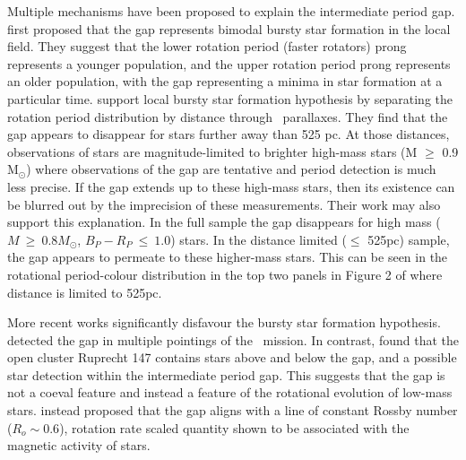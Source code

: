 Multiple mechanisms have been proposed to explain the intermediate period gap.
\citet{mcquillan_rotation_2014} first proposed that the gap represents bimodal bursty star formation in the local \kepler{} field.
They suggest that the lower rotation period (faster rotators) prong represents a younger population, and the upper rotation period prong represents an older population, with the gap representing a minima in star formation at a particular time.
\citet{davenport_rotating_2018} support local bursty star formation hypothesis by separating the \kepler{} rotation period distribution by distance through \gaia{} \ parallaxes.
They find that the gap appears to disappear for stars further away than 525 pc.
At those distances, observations of stars are magnitude-limited to brighter high-mass stars (M $\geq$ 0.9 M$_{\odot}$) where observations of the gap are tentative and period detection is much less precise.
If the gap extends up to these high-mass stars, then its existence can be blurred out by the imprecision of these measurements.
Their work may also support this explanation.
In the full \citep{mcquillan_rotation_2014} sample the gap disappears for high mass ($M \ \geq \ 0.8 M_{\odot}$, $B_P - R_P \ \leq \ 1.0$) stars.
In the distance limited ($\leq$ 525pc) sample, the gap appears to permeate to these higher-mass stars. 
This can be seen in the rotational period-colour distribution in the top two panels in Figure 2 of \citet{davenport_rotating_2018} where distance is limited to 525pc.

More recent works significantly disfavour the bursty star formation hypothesis.
\citet{gordon_stellar_2021} detected the gap in multiple pointings of the \ktoo \ mission. 
In contrast, \citet{curtis_when_2020} found that the open cluster Ruprecht 147 contains stars above and below the gap, and a possible star detection within the intermediate period gap.
This suggests that the gap is not a coeval feature and instead a feature of the rotational evolution of low-mass stars.
\citet{curtis_when_2020} instead proposed that the gap aligns with a line of constant Rossby number ($R_o\sim 0.6$), rotation rate scaled quantity shown to be associated with the magnetic activity of stars.

